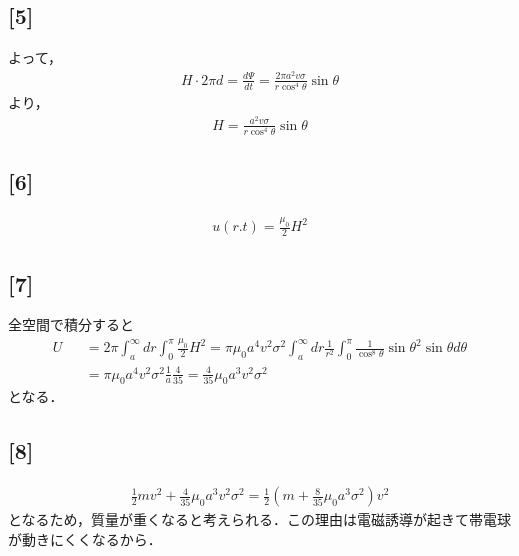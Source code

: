 \documentclass[12pt,dvipdfmx]{jsarticle}
\begin{document}
\subsection*{\large{[5]}}
よって，
\begin{eqnarray}
  H \cdot 2\pi d = \frac{d\Psi}{d t} = \frac{2\pi a^2 v\sigma}{r\cos^4\theta}\sin\theta
\end{eqnarray}
より，
\begin{eqnarray}
  H = \frac{a^2 v\sigma}{r\cos^4\theta}\sin\theta
\end{eqnarray}
\subsection*{\large{[6]}}
\begin{eqnarray}
  u(r.t) = \frac{\mu_0}{2}H^2
\end{eqnarray}
\subsection*{\large{[7]}}
全空間で積分すると
\begin{eqnarray}
  U &&= 2\pi \int_a^{\infty}dr \int_0^{\pi} \frac{\mu_0}{2}H^2 = \pi \mu_0 a^4v^2\sigma^2 \int_a^{\infty}dr\frac{1}{r^2} \int_0^{\pi} \frac{1}{\cos^8\theta}\sin\theta^2 \sin\theta d\theta\\
  &&=\pi \mu_0 a^4v^2\sigma^2 \frac{1}{a}\frac{4}{35} = \frac{4}{35} \mu_0 a^3 v^2\sigma^2
\end{eqnarray}
となる．
\subsection*{\large{[8]}}
\begin{eqnarray}
  \frac{1}{2}mv^2 + \frac{4}{35} \mu_0 a^3 v^2\sigma^2 = \frac{1}{2}\left( m+\frac{8}{35} \mu_0 a^3 \sigma^2 \right)v^2
\end{eqnarray}
となるため，質量が重くなると考えられる．この理由は電磁誘導が起きて帯電球が動きにくくなるから．
\end{document}

